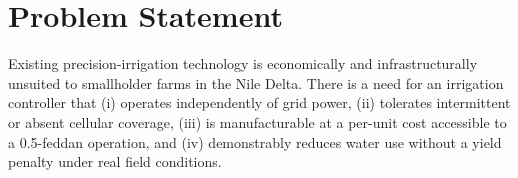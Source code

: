 \section{Problem Statement}
\begin{tcolorbox}[notebox=Problem Statement]
Existing precision-irrigation technology is economically and infrastructurally unsuited to
smallholder farms in the Nile Delta. There is a need for an irrigation controller that (i)
operates independently of grid power, (ii) tolerates intermittent or absent cellular
coverage, (iii) is manufacturable at a per-unit cost accessible to a 0.5-feddan operation, and
(iv) demonstrably reduces water use without a yield penalty under real field conditions.
\end{tcolorbox}
